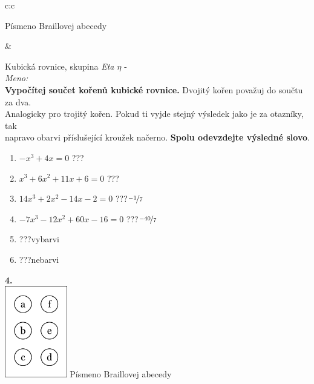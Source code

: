 \documentclass[10pt]{report}
\begin{document}
\begin{tabular}{c:c}
\begin{minipage}[c][99mm][t]{0.49\linewidth}
\begin{center}
\begin{minipage}{0.20\linewidth}
\begin{center}
{\small Písmeno Braillovej abecedy}
\end{center}
\end{minipage}
\end{center}
\end{minipage}
&
\begin{minipage}[c][99mm][t]{0.49\linewidth}
\begin{center}
\vspace{7mm}
{\huge Kubická rovnice, skupina \textit{Eta $\eta$} -}\\[4.5mm]
\textit{Meno:}\phantom{xxxxxxxxxxxxxxxxxxxxxxxxxxxxxxxxxxxxxxxxxxxxxxxxxxxxxxxxxxxxxxxxx}\\[3.5mm]
\textbf{Vypočítej součet kořenů kubické rovnice.} Dvojitý kořen považuj do součtu za dva.\\Analogicky pro trojitý kořen. Pokud ti vyjde stejný výsledek jako je za otazníky, tak\\napravo obarvi příslušející kroužek načerno. \textbf{Spolu odevzdejte výsledné slovo}.\\[3mm]
\begin{minipage}{0.77\linewidth}
\begin{center}
\begin{varwidth}{\textwidth}
\begin{enumerate}
\large
\item $-x^3+4x=0$\quad \dotfill\; ???\;\dotfill {}
\item $x^3+6x^2+11x+6=0$\quad \dotfill\; ???\;\dotfill {}
\item $14x^3+2x^2-14x-2=0$\quad \dotfill\; ???\;\dotfill \quad $\nicefrac{-1}{7}$
\item $-7x^3-12x^2+60x-16=0$\quad \dotfill\; ???\;\dotfill \quad $\nicefrac{-40}{7}$
\item \quad \dotfill\; ???\;\dotfill \quad vybarvi
\item \quad \dotfill\; ???\;\dotfill \quad nebarvi
\end{enumerate}
\end{varwidth}
\end{center}
\end{minipage}
\begin{minipage}{0.20\linewidth}
\begin{center}
{\Huge\bfseries 4.} \\[2mm]
\includegraphics[height=40mm]{../images/braille.png}
{\small Písmeno Braillovej abecedy}
\end{center}
\end{minipage}
\end{center}
\end{minipage}

\end{tabular}
\end{document}
